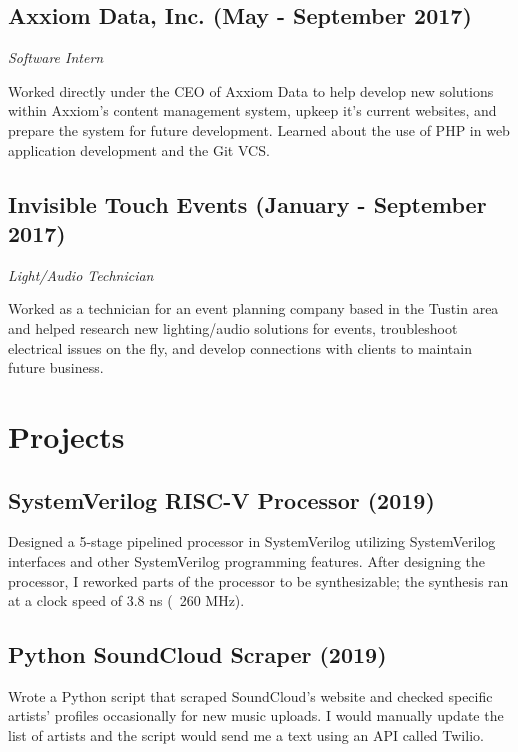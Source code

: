 \documentclass{article}
\begin{document}
\subsection{Axxiom Data, Inc. (May - September 2017)}

\noindent\textit{Software Intern}

Worked directly under the CEO of Axxiom Data to help develop new solutions within Axxiom's
content management system, upkeep it's current websites, and prepare the system for future development. Learned about 
the use of PHP in web application development and the Git VCS.

\subsection{Invisible Touch Events (January - September 2017)} 

\noindent\textit{Light/Audio Technician}

Worked as a technician for an event planning company based in the Tustin area and helped research
new lighting/audio solutions for events, troubleshoot electrical issues on the fly, and develop 
connections with clients to maintain future business.

\section{Projects}

\subsection{SystemVerilog RISC-V Processor (2019)}

Designed a 5-stage pipelined processor in SystemVerilog utilizing SystemVerilog interfaces and other 
SystemVerilog programming features. After designing the processor, I reworked parts of the processor 
to be synthesizable; the synthesis ran at a clock speed of 3.8 ns (~260 MHz).

\subsection{Python SoundCloud Scraper (2019)}

Wrote a Python script that scraped SoundCloud's website and checked specific artists' profiles occasionally for new music uploads. 
I would manually update the list of artists and the script would send me a text using an API called Twilio.
\end{document}
